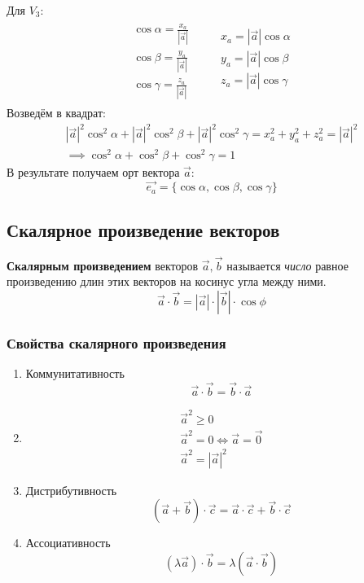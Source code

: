 \begin{eg}
  Для $V_3$: \\
  \begin{gather*}
    \begin{matrix}
      \cos \alpha = \frac{x_a}{|\vec{a}|} \\
      \cos \beta = \frac{y_a}{|\vec{a}|} \\
      \cos \gamma = \frac{z_a}{|\vec{a}|}
    \end{matrix}
    \qquad
    \begin{matrix}
      x_a = |\vec{a}| \cos \alpha \\
      y_a = |\vec{a}| \cos \beta \\
      z_a = |\vec{a}| \cos \gamma \\
    \end{matrix}
  \end{gather*}
  Возведём в квадрат:
  \begin{gather*}
    |\vec{a}|^2 \cos^2 \alpha + |\vec{a}|^2 \cos^2 \beta + |\vec{a}|^2 \cos^2 \gamma = x_a^2 + y_a^2 + z_a^2 = |\vec{a}|^2 \\
    \implies \cos^2 \alpha + \cos^2 \beta + \cos^2 \gamma = 1
  \end{gather*}
  В результате получаем орт вектора $\vec{a}$: \[
  \vec{e_a} = \{\cos \alpha, \cos \beta, \cos \gamma\} 
  \] 
\end{eg}

\subsection{Скалярное произведение векторов}

\begin{definition}
  \textbf{Скалярным произведением} векторов $\vec{a}, \vec{b}$ называется \textit{число}  равное произведению длин этих векторов на косинус угла между ними.\[
  \vec{a} \cdot \vec{b} = |\vec{a}| \cdot |\vec{b}| \cdot \cos \phi
  \] 
\end{definition}

\subsubsection{Свойства скалярного произведения}

\begin{enumerate}
  \item Коммунитативность \[
    \vec{a} \cdot \vec{b} = \vec{b} \cdot \vec{a}
  \] 
  \item
  \begin{gather*}
    \vec{a}^2 \ge 0 \\
    \vec{a}^2 = 0 \iff \vec{a} = \vec{0} \\
    \vec{a}^2 = |\vec{a}|^2
  \end{gather*}
  \item Дистрибутивность \[
      \left( \vec{a} + \vec{b} \right) \cdot \vec{c} = \vec{a} \cdot \vec{c} + \vec{b} \cdot \vec{c}
  \]
  \item Ассоциативность \[
    \left( \lambda \vec{a} \right) \cdot \vec{b} = \lambda \left( \vec{a} \cdot \vec{b} \right) 
  \]
\end{enumerate}

